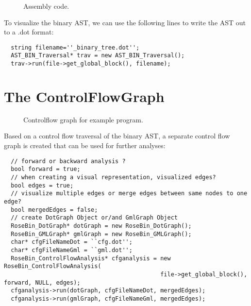 \begin{figure}[!h]
{\indent
{\mySmallFontSize


\begin{latexonly}
   
\end{latexonly}

\begin{htmlonly}
   
\end{htmlonly}

}
}
\caption{Assembly code.}
\label{Tutorial:examplesourcecode2}
\end{figure}


To visualize the binary AST, we can use the following lines to
write the AST out to a .dot format:

{\mySmallFontSize
\begin{verbatim}
  string filename=''_binary_tree.dot'';
  AST_BIN_Traversal* trav = new AST_BIN_Traversal();
  trav->run(file->get_global_block(), filename);
\end{verbatim}
}


\section{The ControlFlowGraph}

\begin{figure}
\caption{Controlflow graph for example program.}
\label{Tutorial:examplefig1}
\end{figure}

Based on a control flow traversal of the binary AST, a separate control flow graph
is created that can be used for further analyses:


{\mySmallFontSize
\begin{verbatim}
  // forward or backward analysis ?
  bool forward = true;
  // when creating a visual representation, visualized edges?
  bool edges = true;
  // visualize multiple edges or merge edges between same nodes to one edge?
  bool mergedEdges = false;
  // create DotGraph Object or/and GmlGraph Object
  RoseBin_DotGraph* dotGraph = new RoseBin_DotGraph();
  RoseBin_GMLGraph* gmlGraph = new RoseBin_GMLGraph();
  char* cfgFileNameDot = ``cfg.dot'';
  char* cfgFileNameGml = ``gml.dot'';
  RoseBin_ControlFlowAnalysis* cfganalysis = new RoseBin_ControlFlowAnalysis(
                                             file->get_global_block(), forward, NULL, edges);
  cfganalysis->run(dotGraph, cfgFileNameDot, mergedEdges);
  cfganalysis->run(gmlGraph, cfgFileNameGml, mergedEdges);
\end{verbatim}
}

